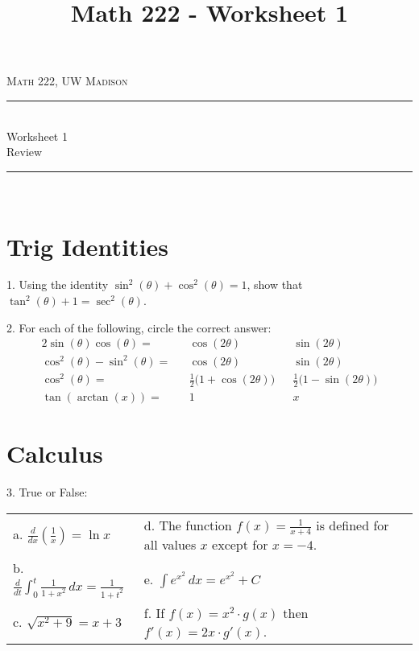 \documentclass[paper=a4, fontsize=11pt]{scrartcl} %
\title{Math 222 - Worksheet 1}
\numberwithin{equation}{section} %
\numberwithin{figure}{section} %
\numberwithin{table}{section} %
\newcommand{\horrule}[1]{\rule{\linewidth}{#1}} %
\begin{document}
{
\normalfont \normalsize 
\begin{flushright}
\textsc{Math 222, UW Madison}
\end{flushright}
{\center
\horrule{0.5pt} \\[0.4cm] %
{\huge Worksheet 1}\\
Review \\ %
\horrule{2pt} \\[0.5cm] %
}}



\section*{Trig Identities}

1. Using the identity $\sin^2(\theta) + \cos^2(\theta) = 1$, show that $\tan^2(\theta) + 1 = \sec^2(\theta)$.
\vfill

2. For each of the following, circle the correct answer:
\begin{align*}
2\sin(\theta)\cos(\theta) = && \cos(2\theta) && \sin(2\theta) \\
\cos^2(\theta) - \sin^2(\theta) = && \cos(2\theta) && \sin(2\theta) \\
\cos^2(\theta) = && \frac{1}{2}\big(1 + \cos(2\theta)\big) && \frac{1}{2}\big(1 - \sin(2\theta)\big) \\
\tan(\arctan(x)) = && 1 && x
\end{align*}\newline

\section*{Calculus}

3. True or False:\\

\begin{tabularx}{\textwidth}{ X X }
a. \quad $\displaystyle \frac{d}{dx}\left(\frac{1}{x}\right) = \ln x$ &
d. \quad The function $\displaystyle f(x) = \frac{1}{x+4}$ is defined for all values $x$ except for $x = -4$. \\
\noalign{\smallskip}\noalign{\smallskip}\noalign{\smallskip}
b. \quad $\displaystyle \frac{d}{dt} \int_0^t \frac{1}{1+x^2}\,dx = \frac{1}{1+t^2}$ &
e. \quad $\displaystyle \int e^{x^2}\,dx = e^{x^2} + C$ \\
\noalign{\smallskip}\noalign{\smallskip}\noalign{\smallskip}\noalign{\smallskip}
c. \quad $\displaystyle \sqrt{x^2 + 9} = x + 3$ &
f. \quad If $f(x) = x^2 \cdot g(x)$ then $f'(x) = 2x \cdot g'(x)$.
\end{tabularx}\newline\newline\newline\newline
\end{document}
